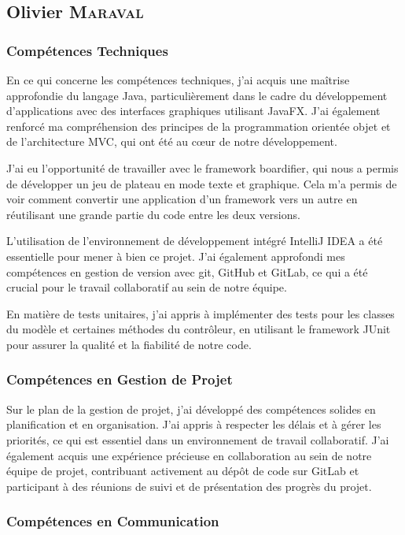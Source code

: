 \subsection*{Olivier \textsc{Maraval}}

\subsubsection*{Compétences Techniques}

En ce qui concerne les compétences techniques, j'ai acquis une maîtrise approfondie du langage Java, particulièrement dans le cadre du développement d'applications avec des interfaces graphiques utilisant JavaFX. J'ai également renforcé ma compréhension des principes de la programmation orientée objet et de l'architecture MVC, qui ont été au cœur de notre développement.

J'ai eu l'opportunité de travailler avec le framework boardifier, qui nous a permis de développer un jeu de plateau en mode texte et graphique. Cela m'a permis de voir comment convertir une application d'un framework vers un autre en réutilisant une grande partie du code entre les deux versions.

L'utilisation de l'environnement de développement intégré IntelliJ IDEA a été essentielle pour mener à bien ce projet. J'ai également approfondi mes compétences en gestion de version avec git, GitHub et GitLab, ce qui a été crucial pour le travail collaboratif au sein de notre équipe.

En matière de tests unitaires, j'ai appris à implémenter des tests pour les classes du modèle et certaines méthodes du contrôleur, en utilisant le framework JUnit pour assurer la qualité et la fiabilité de notre code.

\subsubsection*{Compétences en Gestion de Projet}

Sur le plan de la gestion de projet, j'ai développé des compétences solides en planification et en organisation. J'ai appris à respecter les délais et à gérer les priorités, ce qui est essentiel dans un environnement de travail collaboratif. J'ai également acquis une expérience précieuse en collaboration au sein de notre équipe de projet, contribuant activement au dépôt de code sur GitLab et participant à des réunions de suivi et de présentation des progrès du projet.

\subsubsection*{Compétences en Communication}


